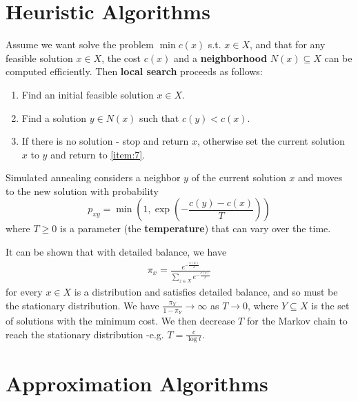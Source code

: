 \section{Heuristic Algorithms}
\label{sec:heuristic-algorithms}

\begin{defn}
  \label{sec:heuristic-algorithms-1}
  Assume we want solve the problem $\min c(x)$ s.t. $x \in X$, and
  that for any feasible solution $x \in X$, the cost $c(x)$ and a
  \textbf{neighborhood} $N(x) \subseteq X$ can be computed
  efficiently.  Then \textbf{local search} proceeds as follows:
  \begin{enumerate}
  \item Find an initial feasible solution $x \in X$.
  \item\label{item:7} Find a solution $y \in N(x)$ such that $c(y) < c(x)$.
  \item If there is no solution - stop and return $x$, otherwise set
    the current solution $x$ to $y$ and return to \ref{item:7}.
  \end{enumerate}
\end{defn}

\begin{defn}
  \label{sec:heuristic-algorithms-2}
  Simulated annealing considers a neighbor $y$ of the current
  solution $x$ and moves to the new solution with probability
  \begin{equation}
    p_{xy} = \min(1, \exp(-\frac{c(y) - c(x)}{T}))
  \end{equation}
  where $T \geq 0$ is a
  parameter (the \textbf{temperature}) that can vary over the time.

  It can be shown that with detailed balance, we have
  \begin{align}
    \label{eq:14}
    \pi_{x} = \frac{e^{-\frac{c(x)}{T}}}{\sum_{z \in X}^{} e^{-\frac{c(z)}{T}}}
  \end{align} for every $x \in X$ is a distribution and satisfies
  detailed balance, and so must be the stationary distribution.
  We have $\frac{\pi_{Y}}{1 - \pi_{Y}} \rightarrow \infty$ as $T
  \rightarrow 0$, where $Y \subseteq X$ is the set of solutions with
  the minimum cost. We then decrease $T$ for the Markov chain to reach
  the stationary distribution -e.g. $T = \frac{c}{\log t}$.
\end{defn}

\section{Approximation Algorithms}
\label{sec:appr-algor}

